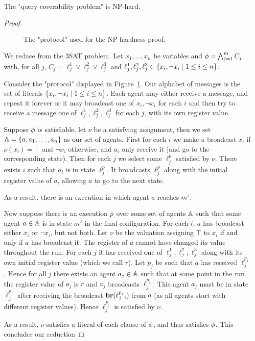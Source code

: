 \begin{proposition}
	\label{prop:np-hard-query-cover}
	The "query coverability problem" is NP-hard.
\end{proposition}

\ifproofs
\begin{proof}
	\begin{figure}[h]
		
		\label{fig:np-hard}
		\caption{The "protocol" used for the NP-hardness proof.}
	\end{figure}
	
	We reduce from the 3SAT problem.
	Let $x_1, \ldots, x_n$ be variables and $\phi = \bigwedge_{j=1}^m C_j$ with, for all $j$, $C_j = \ell_j^1 \lor \ell_j^2 \lor \ell_j^3$ and $\ell_j^1, \ell_j^2, \ell_j^3 \in \{x_i, \neg x_i \mid 1 \leq i \leq n\}$. 

	Consider the "protocol" displayed in Figure~\ref{fig:np-hard}.
	Our alphabet of messages is the set of literals $\{x_i, \neg x_i \mid 1 \leq i \leq n\}$.
	Each agent may either receive a message, and repeat it forever or it may broadcast one of $x_i, \neg x_i$ for each $i$ and then try to receive a message one of $\ell_j^1, \ell_j^2, \ell_j^3$ for each $j$, with its own register value.
	
	Suppose $\phi$ is satisfiable, let $\nu$ be a satisfying assignment, then we set $\mathbb{A} = \{a, a_1, \ldots, a_n\}$ as our set of agents. First for each $i$ we make $a$ broadcast $x_i$ if $\nu(x_i)= \top$ and $\neg x_i$ otherwise, and $a_i$ only receive it (and go to the corresponding state).
	Then for each $j$ we select some $\ell_j^p$ satisfied by $\nu$. There exists $i$ such that $a_i$ is in state $\ell_j^p$. It broadcasts $\ell_j^p$ along with the initial register value of $a$, allowing $a$ to go to the next state.
	
	As a result, there is an execution in which agent $a$ reaches $m'$.
	
	Now suppose there is an execution $\rho$ over some set of agents $\mathbb{A}$ such that some agent $a \in \mathbb{A}$ is in state $m'$ in the final configuration.
	For each $i$, $a$ has broadcast either $x_i$ or $\neg x_i$, but not both.
	Let $\nu$ be the valuation assigning $\top$ to $x_i$ if and only if $a$ has broadcast it.
	The register of $a$ cannot have changed its value throughout the run. 
	For each $j$ it has received one of $\ell_j^1, \ell_j^2, \ell_j^3$ along with its own initial register value (which we call $r$). Let $p_j$ be such that $a$ has received $\ell_j^{p_j}$.
	Hence for all $j$ there exists an agent $a_j \in \mathbb{A}$ such that at some point in the run the register value of $a_j$ is $r$ and $a_j$ broadcasts $\ell_j^{p_j}$.
	This agent $a_j$ must be in state $\ell_j^{p_j}$ after receiving the broadcast $\br{\ell_j^{p_j}}$ from $a$ (as all agents start with different register values).
	Hence $\ell_j^{p_j}$ is satisfied by $\nu$. 
	
	As a result, $\nu$ satisfies a literal of each clause of $\phi$, and thus satisfies $\phi$. This concludes our reduction
\end{proof}
\fi